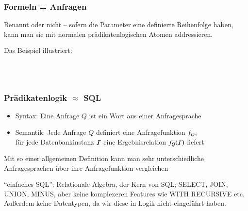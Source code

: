 \documentclass[onlymath]{beamer}
\begin{document}
\begin{frame}\frametitle{Formeln = Anfragen}

Benannt oder nicht -- sofern die Parameter eine definierte Reihenfolge haben,
kann man sie mit normalen prädikatenlogischen Atomen addressieren.\medskip

\pause

Das Beispiel illustriert:
\begin{center}
\large
{}\\[1ex]
\\
\end{center}
\end{frame}


\begin{frame}\frametitle{Prädikatenlogik $\approx$ SQL}

\begin{itemize}
\item Syntax: Eine Anfrage $Q$ ist ein Wort aus einer Anfragesprache
\item Semantik: Jede Anfrage $Q$ definiert eine Anfragefunktion $f_Q$, \\ für jede Datenbankinstanz $\mathcal{I}$ eine Ergebnisrelation $f_Q(\mathcal{I})$ liefert
\end{itemize}\pause

\pause

Mit so einer allgemeinen Definition kann man sehr unterschiedliche Anfragesprachen über ihre Anfragefunktion vergleichen
\smallskip


\tiny "`einfaches SQL"': Relationale Algebra, der Kern von SQL; SELECT, JOIN, UNION, MINUS, aber keine komplexeren Features wie WITH RECURSIVE etc. Außerdem keine Datentypen, da wir diese in Logik nicht eingeführt haben.

\end{frame}
\end{document}
